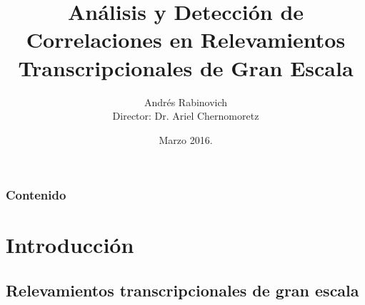 \documentclass[serif,9pt, t]{beamer}
\newif\ifplacelogo %
\begin{document}
\title[Análisis y Detección de Correlaciones en Relevamien\ldots ]{Análisis y Detección de Correlaciones en Relevamientos Transcripcionales de Gran Escala}  
\author[Andrés Rabinovich]{Andrés Rabinovich\\{\small Director: Dr. Ariel Chernomoretz}}

\date{Marzo 2016.}


\begin{frame}
\titlepage
\end{frame}

\placelogofalse

\begin{frame}\frametitle{Contenido}
\tableofcontents
\end{frame} 

\section{Introducción} 


\subsection{Relevamientos transcripcionales de gran escala}
\end{document}
